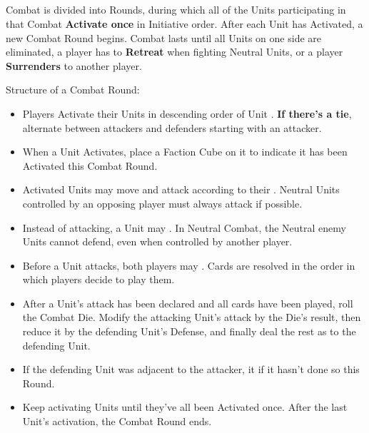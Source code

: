 \begin{multicols}{2}

\subsection*{}
Combat is divided into Rounds, during which all of the Units participating in that Combat \textbf{Activate once} in Initiative order.
After each Unit has Activated, a new Combat Round begins.
Combat lasts until all Units on one side are eliminated, a player has to \textbf{Retreat} when fighting Neutral Units, or a player \textbf{Surrenders} to another player.

Structure of a Combat Round:
\begin{itemize}
  \item Players Activate their Units in descending order of Unit . \textbf{If there's a tie}, alternate between attackers and defenders starting with an attacker.
  \item When a Unit Activates, place a Faction Cube on it to indicate it has been Activated this Combat Round.
  \item Activated Units may move and attack according to their . Neutral Units controlled by an opposing player must always attack if possible.
  \item Instead of attacking, a Unit may .
  In Neutral Combat, the Neutral enemy Units cannot defend, even when controlled by another player.
  \item Before a Unit attacks, both players may . Cards are resolved in the order in which players decide to play them.
  \item After a Unit's attack has been declared and all cards have been played, roll the Combat Die.
    Modify the attacking Unit's attack by the Die's result, then reduce it by the defending Unit's Defense, and finally deal the rest as  to the defending Unit.
  \item If the defending Unit was adjacent to the attacker, it  if it hasn't done so this Round.
  \item Keep activating Units until they've all been Activated once.
After the last Unit's activation, the Combat Round ends.
\end{itemize}


\end{multicols}
